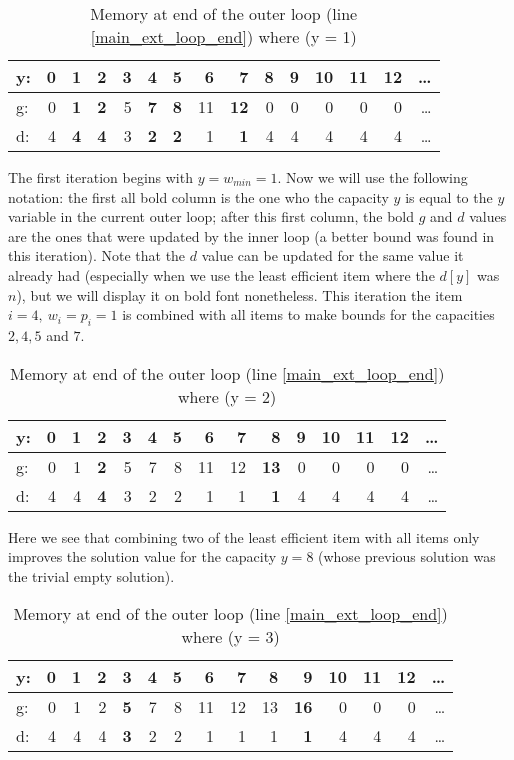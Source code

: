 \documentclass[12pt]{article}
\begin{document}
\begin{table}[H]
\centering
\caption{Memory at end of the outer loop (line \ref{main_ext_loop_end}) where (y = 1)}
\label{mem_y_1}
\begin{tabular}{l|rrrrrrrrrrrrrr}
y: & 0 & \textbf{1} &2 &3 &4 &5 &6 &7 &8 &9 &10 &11 &12 &\dots\\
\hline
g: & 0 & \textbf{1} &\textbf{2} &5 &\textbf{7} &\textbf{8} &11 &\textbf{12} &0 &0 &0 &0 &0 &\dots\\
d: & 4 & \textbf{4} & \textbf{4} & 3 & \textbf{2} & \textbf{2} & 1 & \textbf{1} & 4 & 4 & 4 & 4 & 4 & \dots\\
\end{tabular}
\end{table}

The first iteration begins with \(y = w_{min} = 1\). Now we will use the following notation: the first all bold column is the one who the capacity \(y\) is equal to the \(y\) variable in the current outer loop; after this first column, the bold \(g\) and \(d\) values are the ones that were updated by the inner loop (a better bound was found in this iteration). Note that the \(d\) value can be updated for the same value it already had (especially when we use the least efficient item where the \(d[y]\) was \(n\)), but we will display it on bold font nonetheless. This iteration the item \(i = 4,~w_i = p_i = 1\) is combined with all items to make bounds for the capacities \(2, 4, 5\) and \(7\).

\begin{table}[h]
\centering
\caption{Memory at end of the outer loop (line \ref{main_ext_loop_end}) where (y = 2)}
\label{mem_y_2}
\begin{tabular}{l|rrrrrrrrrrrrrr}
y: & 0 &1 &\textbf{2} &3 &4 &5 &6 &7 &8 &9 &10 &11 &12 &\dots\\
\hline
g: & 0 &1 &\textbf{2} &5 &7 &8 &11 &12 &\textbf{13} &0 &0 &0 &0 &\dots\\
d: & 4 & 4 &\textbf{4} & 3 & 2 & 2 & 1 & 1 & \textbf{1} & 4 & 4 & 4 & 4 & \dots\\
\end{tabular}
\end{table}

Here we see that combining two of the least efficient item with all items only improves the solution value for the capacity \(y = 8\) (whose previous solution was the trivial empty solution).

\begin{table}[h]
\centering
\caption{Memory at end of the outer loop (line \ref{main_ext_loop_end}) where (y = 3)}
\label{mem_y_3}
\begin{tabular}{l|rrrrrrrrrrrrrr}
y: & 0 &1 &2 & \textbf{3} &4 &5 &6 &7 &8 &9 &10 &11 &12 &\dots\\
\hline
g: & 0 &1 &2 & \textbf{5} &7 &8 &11 &12 &13 &\textbf{16} &0 &0 &0 &\dots\\
d: & 4 & 4 & 4 & \textbf{3} & 2 & 2 & 1 & 1 & 1 & \textbf{1} & 4 & 4 & 4 & \dots\\
\end{tabular}
\end{table}
\end{document}
